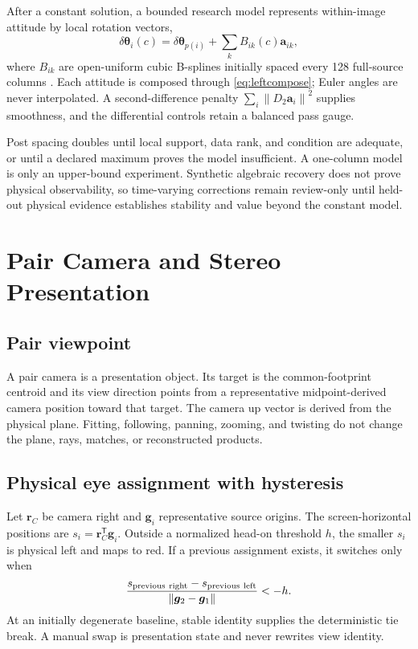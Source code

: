 \documentclass[journal]{IEEEtran}
\newcommand{\T}{^{\mathsf T}}
\newcommand{\norm}[1]{\left\lVert #1\right\rVert}
\begin{document}
After a constant solution, a bounded research model represents within-image
attitude by local rotation vectors,
\begin{equation}
\delta\bm\theta_i(c)=\delta\bm\theta_{p(i)}+
\sum_k B_{ik}(c)\bm a_{ik},
\label{eq:splineattitude}
\end{equation}
where $B_{ik}$ are open-uniform cubic B-splines initially spaced every 128
full-source columns \cite{DeBoor2001}. Each attitude is composed through
\eqref{eq:leftcompose}; Euler angles are never interpolated. A second-difference
penalty $\sum_i\norm{D_2\bm a_i}^2$ supplies smoothness, and the differential
controls retain a balanced pass gauge.

Post spacing doubles until local support, data rank, and condition are adequate,
or until a declared maximum proves the model insufficient. A one-column model
is only an upper-bound experiment. Synthetic algebraic recovery does not prove
physical observability, so time-varying corrections remain review-only until
held-out physical evidence establishes stability and value beyond the constant
model.

\section{Pair Camera and Stereo Presentation}

\subsection{Pair viewpoint}

A pair camera is a presentation object. Its target is the common-footprint
centroid and its view direction points from a representative midpoint-derived
camera position toward that target. The camera up vector is derived from the
physical plane. Fitting, following, panning, zooming, and twisting do not change
the plane, rays, matches, or reconstructed products.

\subsection{Physical eye assignment with hysteresis}

Let $\bm r_C$ be camera right and $\bm g_i$ representative source origins. The
screen-horizontal positions are $s_i=\bm r_C\T\bm g_i$. Outside a normalized
head-on threshold $h$, the smaller $s_i$ is physical left and maps to red. If a
previous assignment exists, it switches only when
\begin{equation}
\frac{s_{\rm previous\ right}-s_{\rm previous\ left}}
{\norm{\bm g_2-\bm g_1}}<-h.
\label{eq:hysteresis}
\end{equation}
At an initially degenerate baseline, stable identity supplies the deterministic
tie break. A manual swap is presentation state and never rewrites view identity.
\end{document}
